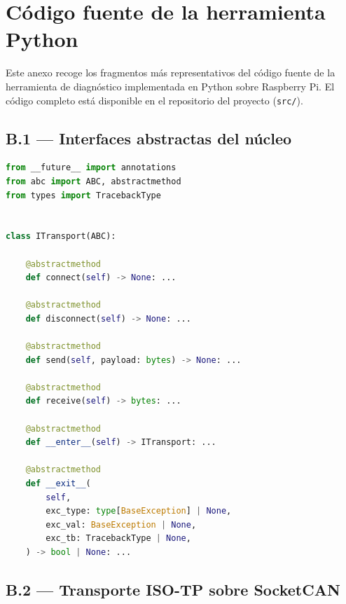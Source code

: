 \chapter{Código fuente de la herramienta Python}
\label{anexo:python}

Este anexo recoge los fragmentos más representativos del código fuente de la
herramienta de diagnóstico implementada en Python sobre Raspberry Pi. El código
completo está disponible en el repositorio del proyecto (\texttt{src/}).

\section*{B.1 — Interfaces abstractas del núcleo}

\begin{lstlisting}[language=Python, caption={Interfaz ITransport — contrato de la capa de transporte}]
from __future__ import annotations
from abc import ABC, abstractmethod
from types import TracebackType


class ITransport(ABC):

    @abstractmethod
    def connect(self) -> None: ...

    @abstractmethod
    def disconnect(self) -> None: ...

    @abstractmethod
    def send(self, payload: bytes) -> None: ...

    @abstractmethod
    def receive(self) -> bytes: ...

    @abstractmethod
    def __enter__(self) -> ITransport: ...

    @abstractmethod
    def __exit__(
        self,
        exc_type: type[BaseException] | None,
        exc_val: BaseException | None,
        exc_tb: TracebackType | None,
    ) -> bool | None: ...
\end{lstlisting}

\section*{B.2 — Transporte ISO-TP sobre SocketCAN}

